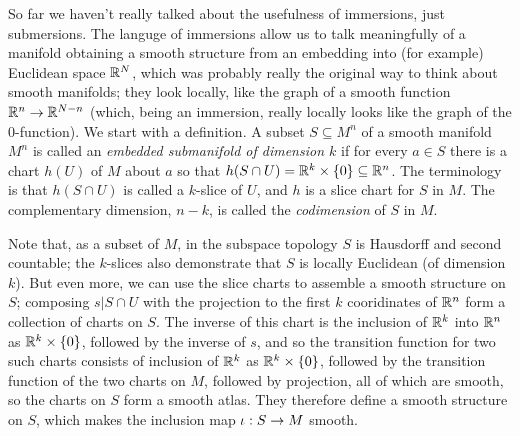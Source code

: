 So far we haven't really talked about the usefulness of immersions, just submersions. 
The languge of immersions allow us to talk meaningfully of a manifold obtaining a
smooth structure from an embedding into (for example) Euclidean space ${\Bbb R}^N$, which was
probably really the original way to think about smooth manifolds; they look locally,
like the graph of a smooth function ${\Bbb R}^n\rightarrow {\Bbb R}^{N-n}$ (which, being an immersion,
really locally looks like the graph of the $0$-function). We start with a definition.
A subset $S\subseteq M^n$ of a smooth manifold $M^n$ is called an {\it embedded submanifold
of dimension $k$} if for every $a\in S$ there is a chart $h(U)$ of $M$ about $a$ so that
$h(S\cap U)={\Bbb R}^k\times \{0\}\subseteq {\Bbb R}^n$. The terminology is that $h(S\cap U)$
is called a $k$-slice of $U$, and $h$ is a slice chart for $S$ in $M$. The complementary
dimension, $n-k$, is called the {\it codimension} of $S$ in $M$.

Note that, as a subset of 
$M$, in the subspace topology $S$ is Hausdorff and second countable; the $k$-slices also
demonstrate that $S$ is locally Euclidean (of dimension $k$). But even more, 
we can use
the slice charts to assemble a smooth structure on $S$; composing $s|{S\cap U}$ with the projection
to the first $k$ cooridinates of ${\Bbb R}^n$ form a collection of charts on $S$. The
inverse of this chart is the inclusion of ${\Bbb R}^k$ into ${\Bbb R}^n$ as ${\Bbb R}^k\times \{0\}$, followed
by the inverse of $s$, and so the transition function for two such charts consists of
inclusion of ${\Bbb R}^k$ as ${\Bbb R}^k\times\{0\}$, followed by the transition 
function of the two charts on $M$, followed by projection,
all of which are smooth, so the charts on $S$ form a smooth atlas. They therefore define
a smooth structure on $S$, which makes the inclusion map $\iota:S\rightarrow M$ smooth. 

